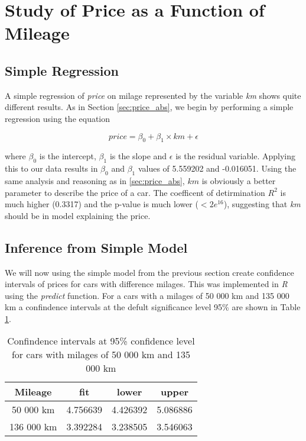 \section{Study of Price as a Function of Mileage} %
\label{sec:price_km}

\subsection{Simple Regression} %
\label{sub:simple_regression}

A simple regression of \textit{price} on milage represented by the variable \textit{km} shows quite different results. As in Section \ref{sec:price_abs}, we begin by performing a simple regression using the equation

\begin{equation}\label{eq:price_km}
	price = \beta_0 + \beta_1 \times km + \epsilon
\end{equation}

\noindent
where $\beta_0$ is the intercept, $\beta_1$ is the slope and $\epsilon$ is 
the residual variable. Applying this to our data results in $\beta_0$ and 
$\beta_1$ values of 5.559202 and -0.016051. Using the same analysis and 
reasoning as in \ref{sec:price_abs}, $km$ is obviously a better parameter to 
describe the price of a car. The coefficent of detirmination $R^2$ is much 
higher (0.3317) and the p-value is much lower ($<2e^{16}$), suggesting that 
\textit{km} should be in model explaining the price.


\subsection{Inference from Simple Model} %
\label{sub:inference_from_simple_model}

We will now using the simple model from the previous section create confidence intervals of prices for cars with difference milages. This was implemented in \textit{R} using the \textit{predict} function. For a cars with a milages of 50 000 km and 135 000 km a confindence intervals at the defult significance level 95\% are shown in Table \ref{tab:confint_km}.

\begin{table}[H]
\centering
\begin{tabular}{||c |c c c||} 
 \hline
 Mileage & fit & lower & upper \\ [0.5ex]
 \hline
 50 000 km & 4.756639 & 4.426392 & 5.086886 \\ 
 136 000 km & 3.392284 & 3.238505 & 3.546063 \\
 \hline
\end{tabular}
\caption{Confindence intervals at 95\% confidence level for cars with milages of 50 000 km and 135 000 km}
\label{tab:confint_km}
\end{table}

